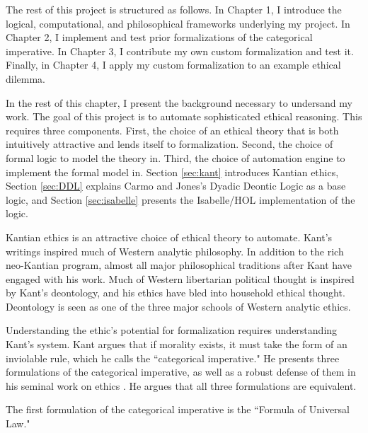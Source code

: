 \begin{isabellebody}
\begin{isamarkuptext}
The rest of this project is structured as follows. In Chapter 1, I introduce the logical, computational, and 
philosophical frameworks underlying my project. In Chapter 2, I implement and test prior formalizations of the categorical
imperative. In Chapter 3, I contribute my own custom formalization and test it. Finally, in Chapter 4, 
I apply my custom formalization to an example ethical dilemma.%
\end{isamarkuptext}\isamarkuptrue%
%
\begin{isamarkuptext}%
In the rest of this chapter, I present the background necessary to undersand my work. The goal 
of this project is to automate sophisticated ethical reasoning. This requires three
components. First, the choice of an ethical theory that is both intuitively attractive and 
lends itself to formalization. Second, the choice of formal logic to model the theory in. Third, the 
choice of automation engine to implement the formal model in. Section \ref{sec:kant} introduces Kantian
ethics, Section \ref{sec:DDL} explains Carmo and Jones's Dyadic Deontic Logic \cite{CJDDL} as a 
base logic, and Section \ref{sec:isabelle} presents the Isabelle/HOL implementation of the logic.%
\end{isamarkuptext}\isamarkuptrue%
%
\isadelimdocument
%
\endisadelimdocument
%
\isatagdocument
%
\isamarkuptrue%
%
\endisatagdocument
{\isafolddocument}%
%
\isadelimdocument
%
\endisadelimdocument
%
\begin{isamarkuptext}%
Kantian ethics is an attractive choice of ethical theory to automate. Kant's writings inspired much of Western analytic philosophy. 
In addition to the rich neo-Kantian program, almost all major philosophical traditions after Kant have
engaged with his work. Much of Western libertarian political thought is inspired by Kant's deontology,
and his ethics have bled into household ethical thought. Deontology is seen as one of the three major 
schools of Western analytic ethics.

Understanding the ethic's potential for formalization requires understanding Kant's system. Kant argues 
that if morality exists, it must take the form of an inviolable rule, which he calls the ``categorical
imperative." He presents three formulations of the categorical imperative, as well as a robust defense
of them in his seminal work on ethics \cite{groundwork}. He argues that all three formulations are 
equivalent. 

The first formulation of the categorical imperative is the ``Formula of Universal Law." 


\end{isamarkuptext}
\end{isabellebody}
